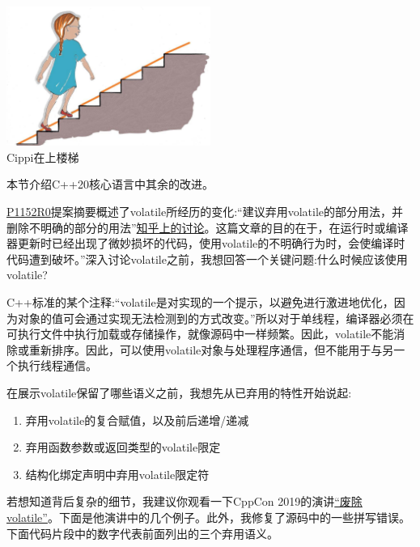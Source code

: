 \begin{center}
\includegraphics[width=0.5\textwidth]{content/3/chapter4/images/47.png}\\
Cippi在上楼梯
\end{center}

本节介绍C++20核心语言中其余的改进。


\href{http://www.open-std.org/jtc1/sc22/wg21/docs/papers/2018/p1152r0.html}{P1152R0}提案摘要概述了volatile所经历的变化:“建议弃用volatile的部分用法，并删除不明确的部分的用法”\href{https://www.zhihu.com/question/366070396}{知乎上的讨论}。这篇文章的目的在于，在运行时或编译器更新时已经出现了微妙损坏的代码，使用volatile的不明确行为时，会使编译时代码遭到破坏。”深入讨论volatile之前，我想回答一个关键问题:什么时候应该使用volatile?

C++标准的某个注释:“volatile是对实现的一个提示，以避免进行激进地优化，因为对象的值可会通过实现无法检测到的方式改变。”所以对于单线程，编译器必须在可执行文件中执行加载或存储操作，就像源码中一样频繁。因此，volatile不能消除或重新排序。因此，可以使用volatile对象与处理程序通信，但不能用于与另一个执行线程通信。

在展示volatile保留了哪些语义之前，我想先从已弃用的特性开始说起:

\begin{enumerate}
\item 
弃用volatile的复合赋值，以及前后递增/递减

\item 
弃用函数参数或返回类型的volatile限定

\item 
结构化绑定声明中弃用volatile限定符
\end{enumerate}

若想知道背后复杂的细节，我建议你观看一下CppCon 2019的演讲\href{https://www.youtube.com/watch?v=KJW_DLaVXIY}{“废除volatile”}。下面是他演讲中的几个例子。此外，我修复了源码中的一些拼写错误。下面代码片段中的数字代表前面列出的三个弃用语义。


